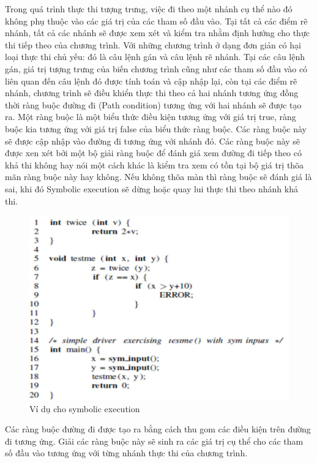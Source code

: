 \documentclass[12pt,a4paper]{article}
\begin{document}
\indent Trong quá trình thực thi tượng trưng, việc đi theo một nhánh cụ thể nào đó không phụ thuộc vào các giá trị của các tham số đầu vào. Tại tất cả các điểm rẽ nhánh, tất cả các nhánh sẽ được xem xét và kiểm tra nhằm định hướng cho thực thi tiếp theo của chương trình. Với những chương trình ở dạng đơn giản có hại loại thực thi chủ yếu: đó là câu lệnh gán và câu lệnh rẽ nhánh. Tại các câu lệnh gán, giá trị tượng trưng của biến chương trình cũng như các tham số đầu vào có liên quan đến câu lệnh đó được tính toán và cập nhập lại, còn tại các điểm rẽ nhánh, chương trình sẽ điều khiển thực thi theo cả hai nhánh tương ứng đồng thời ràng buộc đường đi (Path condition) tương ứng với hai nhánh sẽ được tạo ra. Một ràng buộc là một biểu thức điều kiện tương ứng với giá trị true, ràng buộc kia tương ứng với giá trị false của biểu thức ràng buộc. Các ràng buộc này sẽ được cập nhập vào đường đi tương ứng với nhánh đó. Các ràng buộc này sẽ được xen xét bởi một bộ giải ràng buộc để đánh giá xem đường đi tiếp theo có khả thi không hay nói một cách khác là kiểm tra xem có tồn tại bộ giá trị thõa mãn ràng buộc này hay không. Nếu không thõa màn thì ràng buộc sẽ đánh giá là sai, khi đó Symbolic execution sẽ dừng hoặc quay lui thực thi theo nhánh khả thi.

\begin{figure}[ht]
\begin{center}
\includegraphics{hinhanh/hinh1}
\end{center}
\caption{Ví dụ cho symbolic execution}
\label{refhinh1}
\end{figure}

\indent Các ràng buộc đường đi được tạo ra bằng cách thu gom các điều kiện trên đường đi tương ứng. Giải các ràng buộc này sẽ sinh ra các giá trị cụ thể cho các tham số đầu vào tương ứng với từng nhánh thực thi của chương trình.
\end{document}
